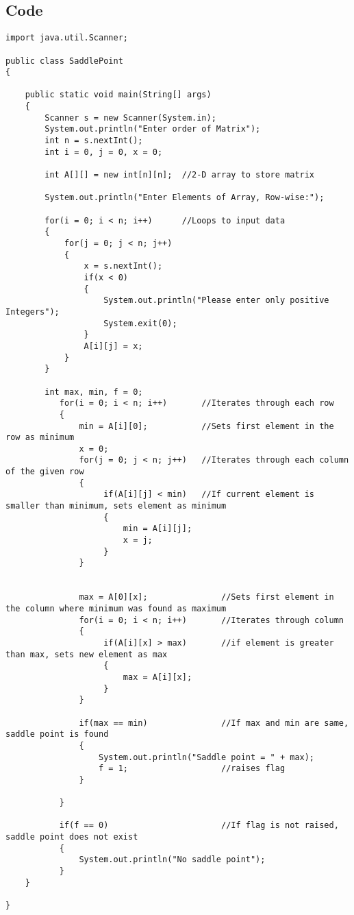 \documentclass[ProgramminAssignment.tex]{subfiles}
\begin{document}
\subsection{Code}
\begin{lstlisting}
import java.util.Scanner;

public class SaddlePoint
{

	public static void main(String[] args)
	{
		Scanner s = new Scanner(System.in);
		System.out.println("Enter order of Matrix");
		int n = s.nextInt();
		int i = 0, j = 0, x = 0;		
		
		int A[][] = new int[n][n];	//2-D array to store matrix
		
		System.out.println("Enter Elements of Array, Row-wise:");
		
		for(i = 0; i < n; i++)		//Loops to input data
		{
			for(j = 0; j < n; j++)
			{
				x = s.nextInt();
				if(x < 0) 
				{
					System.out.println("Please enter only positive Integers");
					System.exit(0);
				}
				A[i][j] = x;
			}
		}
		
		int max, min, f = 0;
	       for(i = 0; i < n; i++)		//Iterates through each row
	       {
	           min = A[i][0];			//Sets first element in the row as minimum
	           x = 0;
	           for(j = 0; j < n; j++)	//Iterates through each column of the given row
	           {
	                if(A[i][j] < min)	//If current element is smaller than minimum, sets element as minimum 
	                {
	                    min = A[i][j];
	                    x = j;
	                }
	           }
	             
	          
	           max = A[0][x]; 				//Sets first element in the column where minimum was found as maximum
	           for(i = 0; i < n; i++)		//Iterates through column
	           {
	                if(A[i][x] > max)		//if element is greater than max, sets new element as max
	                {
	                    max = A[i][x];
	                }
	           }
	             
	           if(max == min)				//If max and min are same, saddle point is found
	           {
	               System.out.println("Saddle point = " + max);
	               f = 1;					//raises flag
	           }
	        	   
	       }
	         
	       if(f == 0)						//If flag is not raised, saddle point does not exist
	       {
	           System.out.println("No saddle point");
	       }
	}

}

\end{lstlisting}
\end{document}

